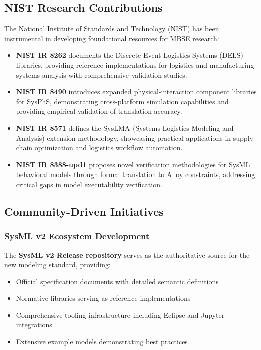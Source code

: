\documentclass[11pt,a4paper]{article}
\begin{document}
\subsection{NIST Research Contributions}

The National Institute of Standards and Technology (NIST) has been instrumental in developing foundational resources for MBSE research:

\begin{itemize}[leftmargin=*]
    \item \textbf{NIST IR 8262} documents the Discrete Event Logistics Systems (DELS) libraries, providing reference implementations for logistics and manufacturing systems analysis with comprehensive validation studies.
    
    \item \textbf{NIST IR 8490} introduces expanded physical-interaction component libraries for SysPhS, demonstrating cross-platform simulation capabilities and providing empirical validation of translation accuracy.
    
    \item \textbf{NIST IR 8571} defines the SysLMA (Systems Logistics Modeling and Analysis) extension methodology, showcasing practical applications in supply chain optimization and logistics workflow automation.
    
    \item \textbf{NIST IR 8388-upd1} proposes novel verification methodologies for SysML behavioral models through formal translation to Alloy constraints, addressing critical gaps in model executability verification.
\end{itemize}

\subsection{Community-Driven Initiatives}

\subsubsection{SysML v2 Ecosystem Development}

The \textbf{SysML v2 Release repository} serves as the authoritative source for the new modeling standard, providing:
\begin{itemize}[leftmargin=*]
    \item Official specification documents with detailed semantic definitions
    \item Normative libraries serving as reference implementations
    \item Comprehensive tooling infrastructure including Eclipse and Jupyter integrations
    \item Extensive example models demonstrating best practices
\end{itemize}
\end{document}
